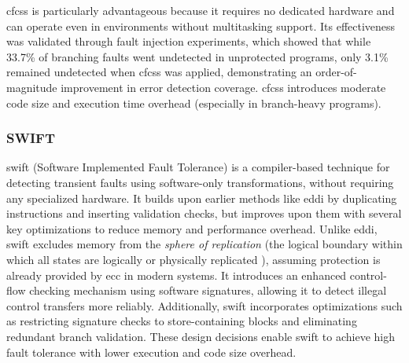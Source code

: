 \acrshort{cfcss} is particularly advantageous because it requires no dedicated hardware and can operate even in environments without multitasking support. Its effectiveness was validated through fault injection experiments, which showed that while 33.7\% of branching faults went undetected in unprotected programs, only 3.1\% remained undetected when \acrshort{cfcss} was applied, demonstrating an order-of-magnitude improvement in error detection coverage. \acrshort{cfcss} introduces moderate code size and execution time overhead (especially in branch-heavy programs).

\subsubsection{SWIFT}

\acrfull{swift} \cite{swift} (Software Implemented Fault Tolerance) is a compiler-based technique for detecting transient faults using software-only transformations, without requiring any specialized hardware. It builds upon earlier methods like \acrshort{eddi} by duplicating instructions and inserting validation checks, but improves upon them with several key optimizations to reduce memory and performance overhead. Unlike \acrshort{eddi}, \acrshort{swift} excludes memory from the \textit{sphere of replication} (the logical boundary within which
all states are logically or physically replicated \cite{shubu}), assuming protection is already provided by \acrshort{ecc} in modern systems. It introduces an enhanced control-flow checking mechanism using software signatures, allowing it to detect illegal control transfers more reliably. Additionally, \acrshort{swift} incorporates optimizations such as restricting signature checks to store-containing blocks and eliminating redundant branch validation. These design decisions enable \acrshort{swift} to achieve high fault tolerance with lower execution and code size overhead.